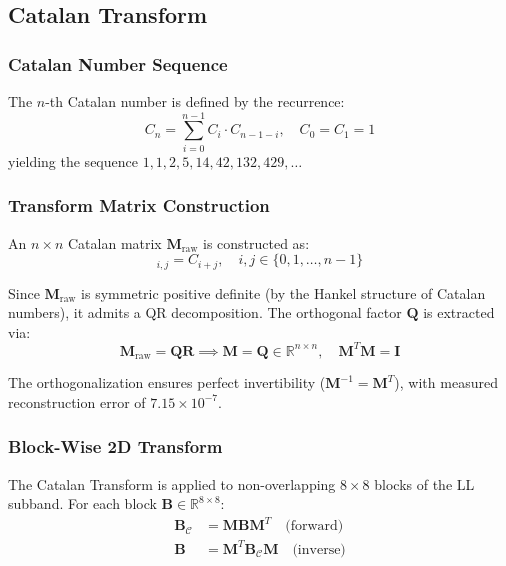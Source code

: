 \documentclass[journal]{IEEEtran}
\begin{document}
\subsection{Catalan Transform}

\subsubsection{Catalan Number Sequence}

The $n$-th Catalan number is defined by the recurrence:
\begin{equation}
  C_n = \sum_{i=0}^{n-1} C_i \cdot C_{n-1-i}, \quad C_0 = C_1 = 1
  \label{eq:catalan_recurrence}
\end{equation}
yielding the sequence $1, 1, 2, 5, 14, 42, 132, 429, \ldots$

\subsubsection{Transform Matrix Construction}

An $n \times n$ Catalan matrix $\mathbf{M}_{\text{raw}}$ is constructed as:
\begin{equation}
  [\mathbf{M}_{\text{raw}}]_{i,j} = C_{i+j}, \quad
  i, j \in \{0, 1, \ldots, n-1\}
  \label{eq:catalan_matrix}
\end{equation}

Since $\mathbf{M}_{\text{raw}}$ is symmetric positive definite (by the
Hankel structure of Catalan numbers), it admits a QR decomposition.
The orthogonal factor $\mathbf{Q}$ is extracted via:
\begin{equation}
  \mathbf{M}_{\text{raw}} = \mathbf{Q}\mathbf{R} \implies
  \mathbf{M} = \mathbf{Q} \in \mathbb{R}^{n \times n},\quad
  \mathbf{M}^T\mathbf{M} = \mathbf{I}
  \label{eq:qr_ortho}
\end{equation}

The orthogonalization ensures perfect invertibility
($\mathbf{M}^{-1} = \mathbf{M}^T$), with measured reconstruction error
of $7.15 \times 10^{-7}$.

\subsubsection{Block-Wise 2D Transform}

The Catalan Transform is applied to non-overlapping $8 \times 8$ blocks
of the LL subband. For each block $\mathbf{B} \in \mathbb{R}^{8 \times 8}$:
\begin{align}
  \mathbf{B}_{\mathcal{C}} &= \mathbf{M}\mathbf{B}\mathbf{M}^T
  \quad \text{(forward)} \label{eq:cat_fwd}\\
  \mathbf{B} &= \mathbf{M}^T\mathbf{B}_{\mathcal{C}}\mathbf{M}
  \quad \text{(inverse)} \label{eq:cat_inv}
\end{align}
\end{document}
